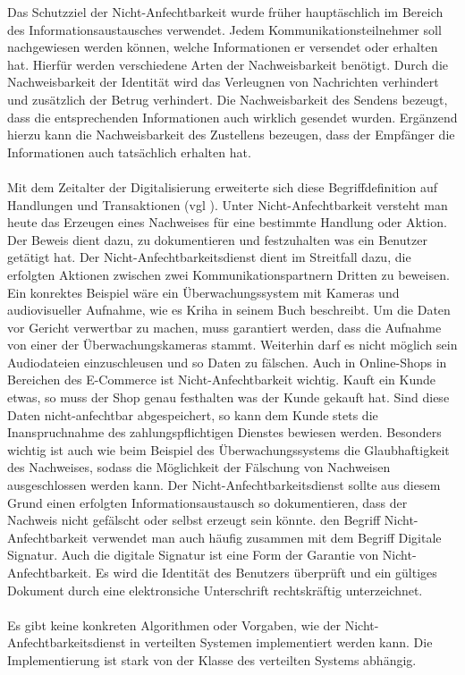 \documentclass[utf8,biblatex]{lni}
\begin{document}
Das Schutzziel der Nicht-Anfechtbarkeit wurde früher hauptäschlich im Bereich des Informationsaustausches verwendet. Jedem Kommunikationsteilnehmer soll nachgewiesen werden können, welche Informationen er 
versendet oder erhalten hat. Hierfür werden verschiedene Arten der Nachweisbarkeit benötigt. Durch die Nachweisbarkeit der Identität wird das Verleugnen von Nachrichten verhindert und zusätzlich der Betrug verhindert.
Die Nachweisbarkeit des Sendens bezeugt, dass die entsprechenden Informationen auch wirklich gesendet wurden. Ergänzend hierzu kann die Nachweisbarkeit des Zustellens bezeugen, dass der Empfänger die Informationen
auch tatsächlich erhalten hat. \citet{Bedner.2010}
\\\\
Mit dem Zeitalter der Digitalisierung erweiterte sich diese Begriffdefinition auf Handlungen und Transaktionen (vgl \citet{Bedner.2010}).
Unter Nicht-Anfechtbarkeit versteht man heute das Erzeugen eines Nachweises für eine bestimmte Handlung oder Aktion. Der Beweis dient dazu, zu dokumentieren und festzuhalten was ein Benutzer getätigt hat. 
Der Nicht-Anfechtbarkeitsdienst
dient im Streitfall dazu, die erfolgten Aktionen zwischen zwei Kommunikationspartnern Dritten zu beweisen.
Ein konrektes Beispiel wäre ein Überwachungssystem mit Kameras und audiovisueller Aufnahme, wie es Kriha in seinem Buch \citet{Kriha.2008} beschreibt. Um die Daten vor Gericht verwertbar zu machen, muss garantiert werden, dass die Aufnahme von einer der Überwachungskameras stammt.
Weiterhin darf es nicht möglich sein Audiodateien einzuschleusen und so Daten zu fälschen. Auch in Online-Shops in Bereichen des E-Commerce ist Nicht-Anfechtbarkeit wichtig.
Kauft ein Kunde etwas, so muss der Shop genau festhalten was der Kunde gekauft hat. Sind diese Daten nicht-anfechtbar abgespeichert, so kann dem Kunde stets die Inanspruchnahme des zahlungspflichtigen Dienstes
bewiesen werden. Besonders wichtig ist auch wie beim Beispiel des Überwachungssystems die Glaubhaftigkeit des Nachweises, sodass die Möglichkeit der Fälschung von Nachweisen ausgeschlossen werden kann.
Der Nicht-Anfechtbarkeitsdienst sollte aus diesem Grund einen erfolgten Informationsaustausch so dokumentieren, dass der Nachweis nicht gefälscht oder selbst erzeugt sein könnte. 
den Begriff Nicht-Anfechtbarkeit verwendet man auch häufig zusammen mit dem Begriff \glqq Digitale Signatur\grqq{}. Auch die digitale Signatur ist eine Form der Garantie von Nicht-Anfechtbarkeit. 
Es wird die Identität des Benutzers überprüft und ein gültiges Dokument durch eine elektronsiche Unterschrift rechtskräftig unterzeichnet.
\\\\
Es gibt keine konkreten Algorithmen oder Vorgaben, wie der Nicht-Anfechtbarkeitsdienst in verteilten Systemen implementiert werden kann.
Die Implementierung ist stark von der Klasse des verteilten Systems abhängig.
\end{document}
